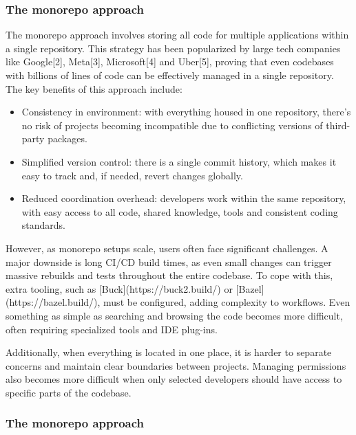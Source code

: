 \subsubsection{The monorepo approach}


The monorepo approach involves storing all code for multiple applications
within a single repository. This strategy has been popularized by
large tech companies like Google[2], Meta[3], Microsoft[4] and Uber[5],
proving that even codebases with billions of lines of code can be effectively
managed in a single repository. The key benefits of this approach
include:

\begin{itemize}
  \item Consistency in environment: with everything housed in one
    repository, there's no risk of projects becoming incompatible due to
    conflicting versions of third-party packages.

  \item Simplified version control: there is a single commit history, which
    makes it easy to track and, if needed, revert changes globally.

  \item Reduced coordination overhead: developers work within the same
    repository, with easy access to all code, shared knowledge, tools and
    consistent coding standards.
\end{itemize}

However, as monorepo setups scale, users often face significant challenges.
A major downside is long CI/CD build times, as even small changes can trigger
massive rebuilds and tests throughout the entire codebase. To cope with this,
extra tooling, such as [Buck](https://buck2.build/) or
[Bazel](https://bazel.build/), must be configured, adding complexity to
workflows. Even something as simple as searching and browsing the code becomes
more difficult, often requiring specialized tools and IDE plug-ins.

Additionally, when everything is located in one place, it is harder to
separate concerns and maintain clear boundaries between projects. Managing
permissions also becomes more difficult when only selected developers should
have access to specific parts of the codebase.

\subsubsection{The monorepo approach}

